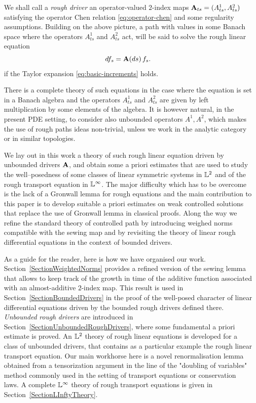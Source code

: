\documentclass[11pt,a4paper]{amsart}
\theoremstyle{plain}%
\theoremstyle{definition}
\theoremstyle{remark}
\numberwithin{equation}{section} %
\begin{document}
\medskip

We shall call a \emph{rough driver} an operator-valued $2$-index maps ${\bf A}_{ts}=(A^1_{ts},A^2_{ts})$ satisfying the operator Chen relation \eqref{eq:operator-chen} and some regularity assumptions. Building on the above picture, a path with values in some Banach space where the operators $A^1_{ts}$ and $A^2_{ts}$ act, will be said to solve the rough linear equation
$$
df_s = {\bf A}(ds)\,f_s.
$$
if the Taylor expansion \eqref{eq:basic-increments} holds.

\smallskip

There is a complete theory of such equations in the case where the equation is set in a Banach algebra and the operators $A^1_{ts}$ and $A^2_{ts}$ are given by left multiplication by some elements of the algebra. It is however natural, in the present PDE setting, to consider also unbounded operators $A^1, A^2$, which makes the use of rough paths ideas non-trivial, unless we work in the analytic category or in similar topologies. 

\medskip
 
We lay out in this work a theory of such rough linear equation driven by unbounded drivers $\bf A$, and obtain some a priori estimates that are used to study the well--posedness of some classes of linear symmetric systems in $\mathbb{L}^2$ and of the rough transport equation in $\mathbb{L}^\infty$. The major difficulty which has to be overcome is the lack of a Gronwall lemma for rough equations and the main contribution to this paper is to develop suitable a priori estimates on weak controlled solutions that replace the use of Gronwall lemma in classical proofs. Along the way we refine the standard theory of controlled path by introducing weighed norms compatible with the sewing map and by revisiting the theory of linear rough differential equations in the context of bounded drivers. 

\medskip

As a guide for the reader, here is how we have organised our work. Section~\ref{SectionWeightedNorms} provides a refined version of the sewing lemma that allows to keep track of the growth in time of the additive function associated with an almost-additive $2$-index map. This result is used in Section~\ref{SectionBoundedDrivers} in the proof of the well-posed character of linear differential equations driven by the bounded rough drivers defined there. \emph{Unbounded rough drivers} are introduced in Section~\ref{SectionUnboundedRoughDrivers}, where some fundamental a priori estimate is proved. An $\mathbb{L}^2$ theory of rough linear equations is developed for a class of unbounded drivers, that contains as a particular example the rough linear transport equation. Our main workhorse here is a novel renormalisation lemma obtained from a tensorization argument in the line of the "doubling of variables" method commonly used in the setting of transport equations or conservation laws. A complete $\mathbb{L}^\infty$ theory of rough transport equations is given in Section~\ref{SectionLInftyTheory}.
\end{document}
